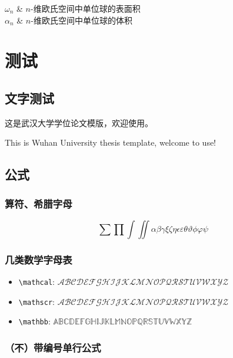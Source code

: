 \documentclass[type = bachelor]{whu-thesis}
\begin{document}
\tableofcontents

\begin{notation}
  $\omega_n$ & $n$-维欧氏空间中单位球的表面积 \\
  $\alpha_n$ & $n$-维欧氏空间中单位球的体积 \\
\end{notation}

\mainmatter

\chapter{测试}

\section{文字测试}

这是武汉大学学位论文模版，欢迎使用。

This is Wuhan University thesis template, welcome to use!

\section{公式}

\subsection{算符、希腊字母}

\[\sum\prod\int\iint\alpha\beta\gamma\xi\zeta\eta\epsilon\varepsilon\theta\vartheta
  \phi\varphi\psi\]


\subsection{几类数学字母表}

\begin{itemize}
  \item \verb|\mathcal|: $\mathcal{ABCDEFGHIJKLMNOPQRSTUVWXYZ}$
  \item \verb|\mathscr|: $\mathscr{ABCDEFGHIJKLMNOPQRSTUVWXYZ}$
  \item \verb|\mathbb|: $\mathbb{ABCDEFGHIJKLMNOPQRSTUVWXYZ}$
\end{itemize}


\subsection{（不）带编号单行公式}
\end{document}
